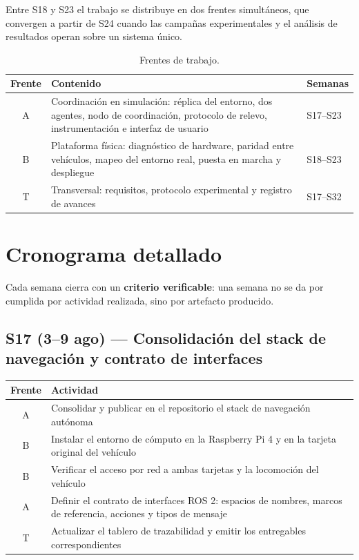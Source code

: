 \documentclass[12pt,letterpaper]{article}
\begin{document}
Entre S18 y S23 el trabajo se distribuye en dos frentes simultáneos, que convergen a partir de S24 cuando las campañas experimentales y el análisis de resultados operan sobre un sistema único.

\begin{table}[H]
    \centering
    \small
    \caption{Frentes de trabajo.}
    \label{tab:frentes}
    \begin{tabular}{@{}cp{9.0cm}l@{}}
        \toprule
        \textbf{Frente} & \textbf{Contenido} & \textbf{Semanas} \\ \midrule
        A & Coordinación en simulación: réplica del entorno, dos agentes, nodo de coordinación, protocolo de relevo, instrumentación e interfaz de usuario & S17--S23 \\ \addlinespace
        B & Plataforma física: diagnóstico de hardware, paridad entre vehículos, mapeo del entorno real, puesta en marcha y despliegue & S18--S23 \\ \addlinespace
        T & Transversal: requisitos, protocolo experimental y registro de avances & S17--S32 \\ \bottomrule
    \end{tabular}
\end{table}

\section{Cronograma detallado}

Cada semana cierra con un \textbf{criterio verificable}: una semana no se da por cumplida por actividad realizada, sino por artefacto producido.

\subsection{S17 (3--9 ago) --- Consolidación del stack de navegación y contrato de interfaces}

\begin{table}[H]
    \centering
    \small
    \begin{tabular}{@{}cp{12.8cm}@{}}
        \toprule
        \textbf{Frente} & \textbf{Actividad} \\ \midrule
        A & Consolidar y publicar en el repositorio el stack de navegación autónoma \\
        B & Instalar el entorno de cómputo en la Raspberry Pi 4 y en la tarjeta original del vehículo \\
        B & Verificar el acceso por red a ambas tarjetas y la locomoción del vehículo \\
        A & Definir el contrato de interfaces ROS 2: espacios de nombres, marcos de referencia, acciones y tipos de mensaje \\
        T & Actualizar el tablero de trazabilidad y emitir los entregables correspondientes \\ \bottomrule
    \end{tabular}
\end{table}
\end{document}
